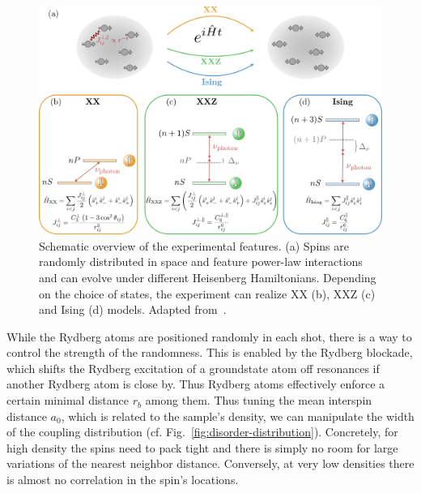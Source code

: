 \begin{figure}[htb]
	\centering
	\includegraphics[width=\textwidth]{gfx/part1/png/experiment_hamiltonians.png}
	\caption{Schematic overview of the experimental features. (a) Spins are randomly distributed in space and feature power-law interactions and can evolve under different Heisenberg Hamiltonians. Depending on the choice of states, the experiment can realize XX (b), XXZ (c) and Ising (d) models.
		Adapted from~\cite{franzObservationAnisotropyindependentMagnetization2024}.}
	\label{fig:experimental-hamiltonians}
\end{figure}

While the Rydberg atoms are positioned randomly in each shot, there is a way to control the strength of the randomness. This is enabled by the Rydberg blockade, which shifts the Rydberg excitation of a groundstate atom off resonances if another Rydberg atom is close by\cite{lukinDipoleBlockadeQuantum2001}. Thus Rydberg atoms effectively enforce a certain minimal distance $r_b$ among them. Thus tuning the mean interspin distance $a_0$, which is related to the sample's density, we can manipulate the width of the coupling distribution (cf. Fig.~\ref{fig:disorder-distribution}). Concretely, for high density the spins need to pack tight and there is simply no room for large variations of the nearest neighbor distance. Conversely, at very low densities there is almost no correlation in the spin's locations.

